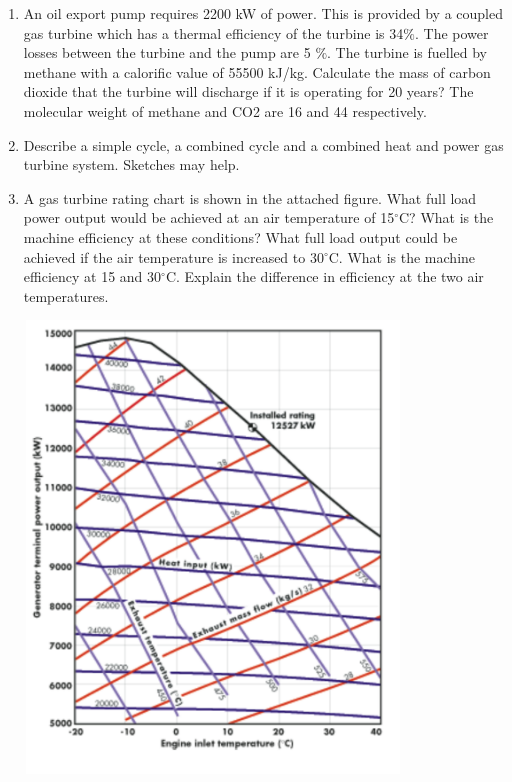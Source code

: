 \documentclass[calculator,datasheet,sample]{exam}
\begin{document}
\begin{question}
\begin{enumerate}
\item  An oil export pump requires 2200 kW of power. This is provided by a coupled gas turbine which has a thermal efficiency of the turbine is 34$\%$. The power losses between the turbine and the pump are 5 $\%$. The turbine is fuelled by methane with a calorific value of 55500 kJ/kg. Calculate the mass of carbon dioxide that the turbine will discharge if it is operating for 20 years? The molecular weight of methane and CO2 are 16 and 44 respectively.~

\item Describe a simple cycle, a combined cycle and a combined heat and power gas turbine system. Sketches may help.~

\item A gas turbine rating chart is shown in the attached figure. What full load power output would be achieved at an air temperature of 15$^{\circ}$C? What is the machine efficiency at these conditions? What full load output could be achieved if the air temperature is increased to 30$^{\circ}$C. What is the machine efficiency at 15 and 30$^{\circ}$C. Explain the difference in efficiency at the two air temperatures.~
\begin{center}
\includegraphics[width=10.0cm,height=12.0cm]{./Pics/EG5597_Sample_Pic1.pdf}
\end{center}

\end{enumerate}
\end{question}
\end{document}
